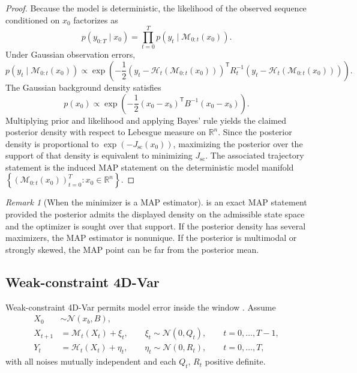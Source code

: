 \documentclass[11pt]{article}
\newcommand{\R}{\mathbb{R}}
\newcommand{\ytraj}{y_{0:T}}
\newcommand{\set}[1]{\left\{ #1 \right\}}
\newcommand{\parens}[1]{\left( #1 \right)}
\newcommand{\transpose}{^{\mathsf T}}
\numberwithin{equation}{section}
\theoremstyle{plain}
\theoremstyle{definition}
\theoremstyle{remark}
\newtheorem{remark}[theorem]{Remark}
\begin{document}
\begin{proof}
Because the model is deterministic, the likelihood of the observed sequence conditioned on $x_0$ factorizes as
\[
p(\ytraj\mid x_0)
=
\prod_{t=0}^{T} p\parens{y_t\mid \mathcal M_{0:t}(x_0)}.
\]
Under Gaussian observation errors,
\[
p\parens{y_t\mid \mathcal M_{0:t}(x_0)}
\propto
\exp\!\left(
-\frac12
\parens{y_t-\mathcal H_t(\mathcal M_{0:t}(x_0))}\transpose
R_t^{-1}
\parens{y_t-\mathcal H_t(\mathcal M_{0:t}(x_0))}
\right).
\]
The Gaussian background density satisfies
\[
p(x_0)
\propto
\exp\!\left(
-\frac12 (x_0-x_b)\transpose B^{-1}(x_0-x_b)
\right).
\]
Multiplying prior and likelihood and applying Bayes' rule yields the claimed posterior density with respect to Lebesgue measure on $\R^n$. Since the posterior density is proportional to $\exp(-J_{\mathrm{sc}}(x_0))$, maximizing the posterior over the support of that density is equivalent to minimizing $J_{\mathrm{sc}}$. The associated trajectory statement is the induced MAP statement on the deterministic model manifold $\set{(\mathcal M_{0:t}(x_0))_{t=0}^{T}:x_0\in\R^n}$.
\end{proof}

\begin{remark}[When the minimizer is a MAP estimator]
\label{rem:map-conditions}
 is an exact MAP statement provided the posterior admits the displayed density on the admissible state space and the optimizer is sought over that support. If the posterior density has several maximizers, the MAP estimator is nonunique. If the posterior is multimodal or strongly skewed, the MAP point can be far from the posterior mean.
\end{remark}

\subsection{Weak-constraint 4D-Var}

Weak-constraint 4D-Var permits model error inside the window \citep{zupanski1997}. Assume
\begin{align}
X_0 &\sim \mathcal N(x_b,B), \\
X_{t+1} &= \mathcal M_t(X_t) + \xi_t, \qquad \xi_t\sim \mathcal N(0,Q_t), \qquad t=0,\dots,T-1, \\
Y_t &= \mathcal H_t(X_t) + \eta_t, \qquad \eta_t\sim \mathcal N(0,R_t), \qquad t=0,\dots,T,
\end{align}
with all noises mutually independent and each $Q_t$, $R_t$ positive definite.
\end{document}
